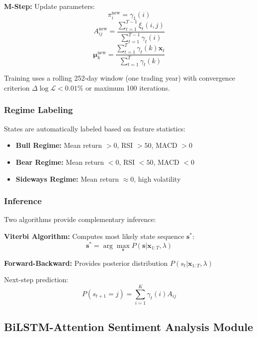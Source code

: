 \documentclass[conference]{IEEEtran}
\begin{document}
\textbf{M-Step:} Update parameters:
\begin{equation}
\pi_i^{\text{new}} = \gamma_1(i)
\end{equation}
\begin{equation}
A_{ij}^{\text{new}} = \frac{\sum_{t=1}^{T-1}\xi_t(i,j)}{\sum_{t=1}^{T-1}\gamma_t(i)}
\end{equation}
\begin{equation}
\boldsymbol{\mu}_k^{\text{new}} = \frac{\sum_{t=1}^{T}\gamma_t(k)\mathbf{x}_t}{\sum_{t=1}^{T}\gamma_t(k)}
\end{equation}

Training uses a rolling 252-day window (one trading year) with convergence criterion $\Delta\log\mathcal{L} < 0.01\%$ or maximum 100 iterations.

\subsubsection{Regime Labeling}
States are automatically labeled based on feature statistics:
\begin{itemize}
\item \textbf{Bull Regime:} Mean return $> 0$, RSI $> 50$, MACD $> 0$
\item \textbf{Bear Regime:} Mean return $< 0$, RSI $< 50$, MACD $< 0$
\item \textbf{Sideways Regime:} Mean return $\approx 0$, high volatility
\end{itemize}

\subsubsection{Inference}
Two algorithms provide complementary inference:

\textbf{Viterbi Algorithm:} Computes most likely state sequence $\mathbf{s}^*$:
\begin{equation}
\mathbf{s}^* = \arg\max_{\mathbf{s}} P(\mathbf{s} | \mathbf{x}_{1:T}, \lambda)
\end{equation}

\textbf{Forward-Backward:} Provides posterior distribution $P(s_t | \mathbf{x}_{1:T}, \lambda)$

Next-step prediction:
\begin{equation}
P(s_{t+1}=j) = \sum_{i=1}^{K}\gamma_t(i)A_{ij}
\end{equation}

\subsection{BiLSTM-Attention Sentiment Analysis Module}
\end{document}
